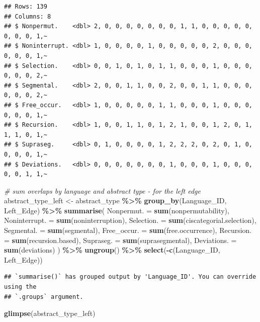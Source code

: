 \documentclass[
]{article}
\newenvironment{Shaded}{\begin{snugshade}}{\end{snugshade}}
\newcommand{\AttributeTok}[1]{\textcolor[rgb]{0.13,0.29,0.53}{#1}}
\newcommand{\CommentTok}[1]{\textcolor[rgb]{0.56,0.35,0.01}{\textit{#1}}}
\newcommand{\FunctionTok}[1]{\textcolor[rgb]{0.13,0.29,0.53}{\textbf{#1}}}
\newcommand{\NormalTok}[1]{#1}
\newcommand{\OtherTok}[1]{\textcolor[rgb]{0.56,0.35,0.01}{#1}}
\newcommand{\SpecialCharTok}[1]{\textcolor[rgb]{0.81,0.36,0.00}{\textbf{#1}}}
\begin{document}
\begin{verbatim}
## Rows: 139
## Columns: 8
## $ Nonpermut.    <dbl> 2, 0, 0, 0, 0, 0, 0, 0, 1, 1, 0, 0, 0, 0, 0, 0, 0, 0, 1,~
## $ Noninterrupt. <dbl> 1, 0, 0, 0, 0, 1, 0, 0, 0, 0, 0, 2, 0, 0, 0, 0, 0, 0, 1,~
## $ Selection.    <dbl> 0, 0, 1, 0, 1, 0, 1, 1, 0, 0, 0, 1, 0, 0, 0, 0, 0, 0, 2,~
## $ Segmental.    <dbl> 2, 0, 0, 1, 1, 0, 0, 2, 0, 0, 1, 1, 0, 0, 0, 0, 0, 0, 2,~
## $ Free_occur.   <dbl> 1, 0, 0, 0, 0, 0, 1, 1, 0, 0, 0, 1, 0, 0, 0, 0, 0, 0, 1,~
## $ Recursion.    <dbl> 1, 0, 0, 1, 1, 0, 1, 2, 1, 0, 0, 1, 2, 0, 1, 1, 1, 0, 1,~
## $ Supraseg.     <dbl> 0, 1, 0, 0, 0, 0, 1, 2, 2, 2, 0, 2, 0, 1, 0, 0, 0, 0, 1,~
## $ Deviations.   <dbl> 0, 0, 0, 0, 0, 0, 0, 1, 0, 0, 0, 1, 0, 0, 0, 0, 0, 1, 1,~
\end{verbatim}

\begin{Shaded}
\begin{Highlighting}[]
\CommentTok{\# sum overlaps by language and abstract type {-} for the left edge}
\NormalTok{abstract\_type\_left }\OtherTok{\textless{}{-}}\NormalTok{ abstract\_type }\SpecialCharTok{\%\textgreater{}\%}
  \FunctionTok{group\_by}\NormalTok{(Language\_ID, Left\_Edge) }\SpecialCharTok{\%\textgreater{}\%}
  \FunctionTok{summarise}\NormalTok{(}
    \AttributeTok{Nonpermut. =} \FunctionTok{sum}\NormalTok{(nonpermutability),}
    \AttributeTok{Noninterrupt. =} \FunctionTok{sum}\NormalTok{(noninterruption),}
    \AttributeTok{Selection. =} \FunctionTok{sum}\NormalTok{(ciscategorial.selection),}
    \AttributeTok{Segmental. =} \FunctionTok{sum}\NormalTok{(segmental),}
    \AttributeTok{Free\_occur. =} \FunctionTok{sum}\NormalTok{(free.occurrence),}
    \AttributeTok{Recursion. =} \FunctionTok{sum}\NormalTok{(recursion.based),}
    \AttributeTok{Supraseg. =} \FunctionTok{sum}\NormalTok{(suprasegmental),}
    \AttributeTok{Deviations. =} \FunctionTok{sum}\NormalTok{(deviations)}
\NormalTok{  ) }\SpecialCharTok{\%\textgreater{}\%}
  \FunctionTok{ungroup}\NormalTok{() }\SpecialCharTok{\%\textgreater{}\%}
  \FunctionTok{select}\NormalTok{(}\SpecialCharTok{{-}}\FunctionTok{c}\NormalTok{(Language\_ID, Left\_Edge))}
\end{Highlighting}
\end{Shaded}

\begin{verbatim}
## `summarise()` has grouped output by 'Language_ID'. You can override using the
## `.groups` argument.
\end{verbatim}

\begin{Shaded}
\begin{Highlighting}[]
\FunctionTok{glimpse}\NormalTok{(abstract\_type\_left)}
\end{Highlighting}
\end{Shaded}
\end{document}
